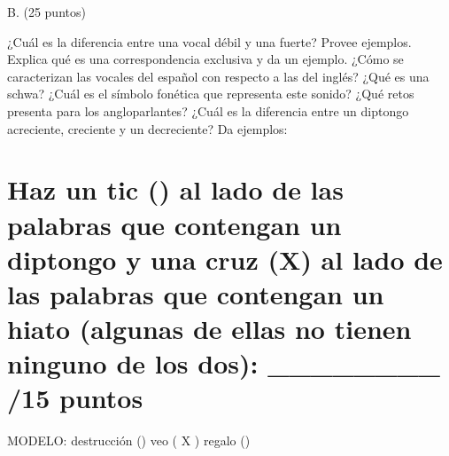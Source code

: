 \documentclass[12pt]{exam}
\begin{document}
\vspace{3mm}\noindent \begin{bf}B. (25 puntos)\end{bf}

		\begin{questions}
			\question ¿Cuál es la diferencia entre una vocal débil y una fuerte? Provee ejemplos.
			\fillwithlines{1.45in}
			\question Explica qué es una correspondencia exclusiva y da un ejemplo.
			\fillwithlines{1.75in}
			\question ¿Cómo se caracterizan las vocales del español con respecto a las del inglés?
			\fillwithlines{1.75in}
			\question ¿Qué es una schwa? ¿Cuál es el símbolo fonética que representa este sonido? ¿Qué retos presenta para los angloparlantes?
			\fillwithlines{1.75in}
			\question ¿Cuál es la diferencia entre un diptongo acreciente, creciente y un decreciente? Da ejemplos:
			\fillwithlines{1.75in}
		\end{questions}
		
\section{Haz un tic (\checked) al lado de las palabras que contengan un diptongo y una cruz (X) al lado de las palabras que contengan un hiato (algunas de ellas no tienen ninguno de los dos): \_\_\_\_\_\_\_\_ /15 puntos}

\vspace{5mm}
\hspace{1mm}\begin{bf}MODELO: destrucción \hspace{5mm}(\checked) \hspace{9mm}veo \hspace{14mm}( X ) \hspace{7.5mm}regalo \hspace{12.25mm}(\hspace{2.5mm})\end{bf}\\
\renewcommand{\arraystretch}{1.275}
\vspace{1.5mm}
\end{document}
